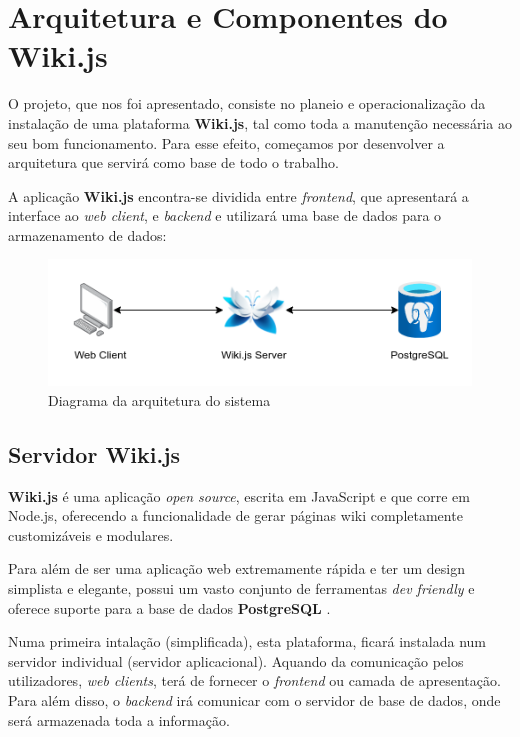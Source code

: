 \section{Arquitetura e Componentes do Wiki.js}

O projeto, que nos foi apresentado, consiste no planeio e operacionalização da instalação de uma plataforma \textbf{Wiki.js}, tal como toda a manutenção necessária ao seu bom funcionamento. Para esse efeito, começamos por desenvolver a arquitetura que servirá como base de todo o trabalho.

A aplicação \textbf{Wiki.js} encontra-se dividida entre \textit{frontend}, que apresentará a interface ao \textit{web client}, e \textit{backend} e utilizará uma base de dados para o armazenamento de dados:

\begin{figure}[h]
    \centering
    \includegraphics[width=\linewidth]{img/wiki_basic_arch.png}
    \caption{Diagrama da arquitetura do sistema}
    \label{fig_1}
\end{figure}

\subsection{Servidor Wiki.js}

\textbf{Wiki.js} é uma aplicação \textit{open source}, escrita em JavaScript e que corre em Node.js, oferecendo a funcionalidade de gerar páginas wiki completamente customizáveis e modulares.

Para além de ser uma aplicação web extremamente rápida e ter um design simplista e elegante, possui um vasto conjunto de ferramentas \textit{dev friendly} e oferece suporte para a base de dados \textbf{PostgreSQL} \cite{wiki-article}.

Numa primeira intalação (simplificada), esta plataforma, ficará instalada num servidor individual (servidor aplicacional). Aquando da comunicação pelos utilizadores, \textit{web clients}, terá de fornecer o \textit{frontend} ou camada de apresentação. Para além disso, o \textit{backend} irá comunicar com o servidor de base de dados, onde será armazenada toda a informação.

